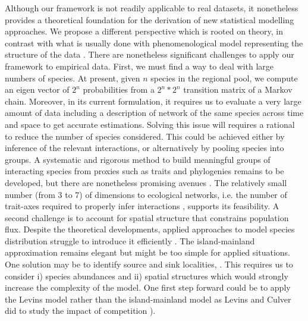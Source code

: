 Although our framework is not readily applicable to real datasets, it nonetheless provides a theoretical foundation for the derivation of new statistical modelling approaches. We propose a different perspective which is rooted on theory, in contrast with what is usually done with phenomenological model representing the structure of the data \citep{Thuiller2013}. There are nonetheless significant challenges to apply our framework to empirical data. First, we must find a way to deal with large numbers of species. At present, given $n$ species in the regional pool, we compute an eigen vector of $2^n$ probabilities from a $2^n*2^n$ transition matrix of a Markov chain. Moreover, in its current formulation, it requires us to evaluate a very large amount of data including a description of network of the same species across time and space to get accurate estimations. Solving this issue will requires a rational to reduce the number of species considered. This could be achieved either by inference of the relevant interactions, or alternatively by pooling species into groups. A systematic and rigorous method to build meaningful groups of interacting species from proxies such as traits and phylogenies remains to be developed, but there are nonetheless promising avenues \citep{Baskerville2011}. The relatively small number (from 3 to 7) of dimensions to ecological networks, i.e. the number of trait-axes required to properly infer interactions \citep{Eklof2013}, supports its feasibility. A second challenge is to account for spatial structure that constrains population flux. Despite the theoretical developments, applied approaches to model species distribution struggle to introduce it efficiently \citep{Boulangeat2012}. The island-mainland approximation remains elegant but might be too simple for applied situations. One solution may be to identify source and sink localities, \citep{Boulangeat2012}. This requires us to consider i) species abundances and ii) spatial structures which would strongly increase the complexity of the model. One first step forward could be to apply the Levins model rather than the island-mainland model as Levins and Culver did to study the impact of competition \citep{Levins1971}).

